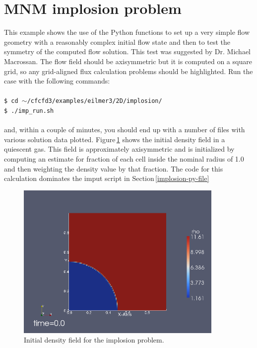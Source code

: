 
\section{MNM implosion problem}
\label{mnm-implosion-sec}
%
This example shows the use of the Python functions to set up
a very simple flow geometry with a reasonably complex initial flow state 
and then to test the symmetry of the computed flow solution.
This test was suggested by Dr. Michael Macrossan.
The flow field should be axisymmetric but it is computed on a square grid,
so any grid-aligned flux calculation problems should be highlighted.
Run the case with the following commands:\\
%
\topbar\\
\texttt{\$ cd $\sim$/cfcfd3/examples/eilmer3/2D/implosion/}\\
\texttt{\$ ./imp\_run.sh}\\
\bottombar\\
%
and, within a couple of minutes, you should end up with a number of files
with various solution data plotted.
Figure\,\ref{implosion-initial-density-fig} shows the initial density field
in a quiescent gas.
This field is approximately axisymmetric and is initialized by computing an estimate
for fraction of each cell inside the nominal radius of 1.0 and then weighting the
density value by that fraction.
The code for this calculation dominates the imput script in Section\,\ref{implosion-py-file}

\begin{figure}[htbp]
\begin{center}
\includegraphics[width=10cm]{../2D/implosion/density-t0000.png}
\end{center}
\caption{Initial density field for the implosion problem.}
\label{implosion-initial-density-fig}
\end{figure}

